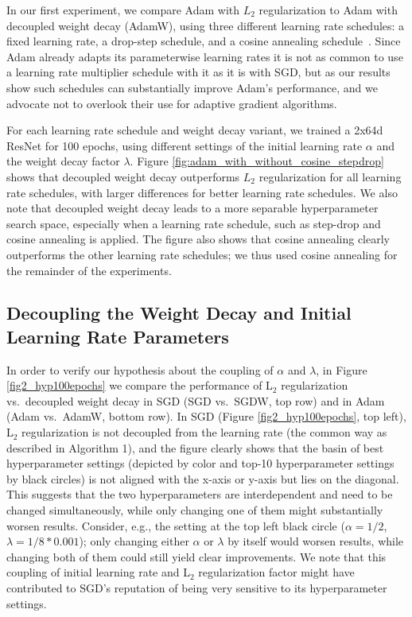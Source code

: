 In our first experiment, we compare Adam with $L_2$ regularization to Adam with decoupled weight decay (AdamW), using three different learning rate schedules: a fixed learning rate, a drop-step schedule, and a cosine annealing schedule~\citep{loshchilov2016sgdr}. Since Adam already adapts its parameterwise learning rates it is not as common to use a learning rate multiplier schedule with it as it is with SGD, but as our results show such schedules can substantially improve Adam's performance, and we advocate not to overlook their use for adaptive gradient algorithms. 

For each learning rate schedule and weight decay variant, we trained a 2x64d ResNet for 100 epochs, using different settings of the initial learning rate $\alpha$ and the weight decay factor $\lambda$. 
Figure \ref{fig:adam_with_without_cosine_stepdrop} shows that decoupled weight decay outperforms $L_2$ regularization for all learning rate schedules, with larger differences for better learning rate schedules. We also note that decoupled weight decay leads to a more separable hyperparameter search space, especially when a learning rate schedule, such as step-drop and cosine annealing is applied. The figure also shows that cosine annealing clearly outperforms the other learning rate schedules; we thus used cosine annealing for the remainder of the experiments.

\subsection{Decoupling the Weight Decay and Initial Learning Rate Parameters}

In order to verify our hypothesis about the coupling of $\alpha$ and  $\lambda$, in Figure \ref{fig2_hyp100epochs} we compare the performance of L$_2$ regularization vs.\ decoupled weight decay in SGD (SGD vs.\ SGDW, top row) and in Adam (Adam vs.\ AdamW, bottom row). In SGD (Figure \ref{fig2_hyp100epochs}, top left), L$_2$ regularization is not decoupled from the learning rate (the common way as described in Algorithm 1), and the figure clearly shows that the basin of best hyperparameter settings (depicted by color and top-10 hyperparameter settings by black circles) is not aligned with the x-axis or y-axis but lies on the diagonal. This suggests that the two hyperparameters are interdependent and need to be changed simultaneously, while only changing one of them might substantially worsen results. Consider, e.g., the setting at the top left black circle ($\alpha=1/2$, $\lambda=1/8*0.001$); only changing either $\alpha$ or $\lambda$ by itself would worsen results, while changing both of them could still yield clear improvements. We note that this coupling of initial learning rate and L$_2$ regularization factor might have contributed to SGD's reputation of being very sensitive to its hyperparameter settings. 

